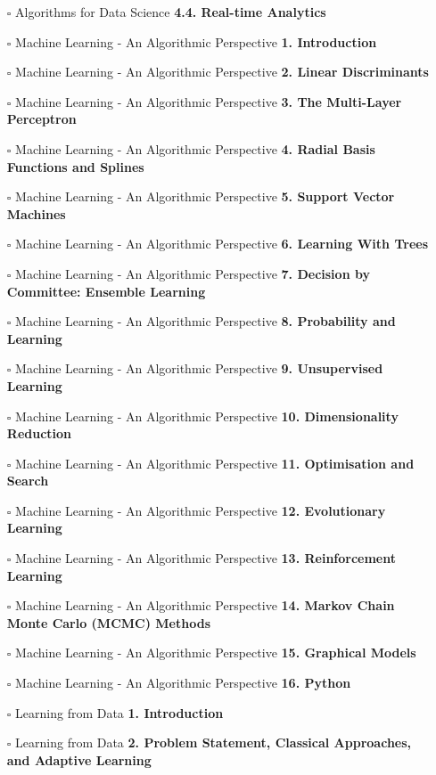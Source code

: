 \documentclass[a4, landscape, 12pt]{article}
\newcommand{\checkbox}{$\square$}%
\begin{document}
\begin{itemize}
{}
\item [\checkbox]  Algorithms for Data Science \textbf{ 4.4. Real-time Analytics
}
\item [\checkbox]  Machine Learning - An Algorithmic Perspective \textbf{ 1. Introduction
}
\item [\checkbox]  Machine Learning - An Algorithmic Perspective \textbf{ 2. Linear Discriminants
}
\item [\checkbox]  Machine Learning - An Algorithmic Perspective \textbf{ 3. The Multi-Layer Perceptron
}
\item [\checkbox]  Machine Learning - An Algorithmic Perspective \textbf{ 4. Radial Basis Functions and Splines
}
\item [\checkbox]  Machine Learning - An Algorithmic Perspective \textbf{ 5. Support Vector Machines
}
\item [\checkbox]  Machine Learning - An Algorithmic Perspective \textbf{ 6. Learning With Trees
}
\item [\checkbox]  Machine Learning - An Algorithmic Perspective \textbf{ 7. Decision by Committee: Ensemble Learning
}
\item [\checkbox]  Machine Learning - An Algorithmic Perspective \textbf{ 8. Probability and Learning
}
\item [\checkbox]  Machine Learning - An Algorithmic Perspective \textbf{ 9. Unsupervised Learning
}
\item [\checkbox]  Machine Learning - An Algorithmic Perspective \textbf{ 10. Dimensionality Reduction
}
\item [\checkbox]  Machine Learning - An Algorithmic Perspective \textbf{ 11. Optimisation and Search
}
\item [\checkbox]  Machine Learning - An Algorithmic Perspective \textbf{ 12. Evolutionary Learning
}
\item [\checkbox]  Machine Learning - An Algorithmic Perspective \textbf{ 13. Reinforcement Learning
}
\item [\checkbox]  Machine Learning - An Algorithmic Perspective \textbf{ 14. Markov Chain Monte Carlo (MCMC) Methods
}
\item [\checkbox]  Machine Learning - An Algorithmic Perspective \textbf{ 15. Graphical Models
}
\item [\checkbox]  Machine Learning - An Algorithmic Perspective \textbf{ 16. Python
}
\item [\checkbox]  Learning from Data \textbf{ 1. Introduction
}
\item [\checkbox]  Learning from Data \textbf{ 2. Problem Statement, Classical Approaches, and Adaptive Learning
}
\end{itemize}
\end{document}
